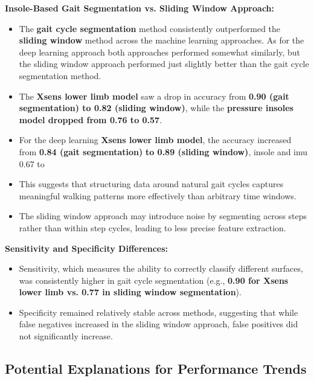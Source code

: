 \textbf{Insole-Based Gait Segmentation vs. Sliding Window Approach:}  
\begin{itemize}
    \item The \textbf{gait cycle segmentation} method consistently outperformed the \textbf{sliding window} method across the machine learning approaches. As for the deep learning approach both approaches performed somewhat similarly, but the sliding window approach performed just slightly better than the gait cycle segmentation method.
    \item The \textbf{Xsens lower limb model} saw a drop in accuracy from \textbf{0.90 (gait segmentation) to 0.82 (sliding window)}, while the \textbf{pressure insoles model dropped from 0.76 to 0.57}.
    \item For the deep learning \textbf{Xsens lower limb model}, the accuracy increased from \textbf{0.84 (gait segmentation)}\textbf{ to 0.89 (sliding window)}, insole and imu 0.67 to 
    \item This suggests that structuring data around natural gait cycles captures meaningful walking patterns more effectively than arbitrary time windows.
    \item The sliding window approach may introduce noise by segmenting across steps rather than within step cycles, leading to less precise feature extraction.
\end{itemize}

\textbf{Sensitivity and Specificity Differences:}  
\begin{itemize}
    \item Sensitivity, which measures the ability to correctly classify different surfaces, was consistently higher in gait cycle segmentation (e.g., \textbf{0.90 for Xsens lower limb vs. 0.77 in sliding window segmentation}).
    \item Specificity remained relatively stable across methods, suggesting that while false negatives increased in the sliding window approach, false positives did not significantly increase.
\end{itemize}

\subsection{Potential Explanations for Performance Trends}

